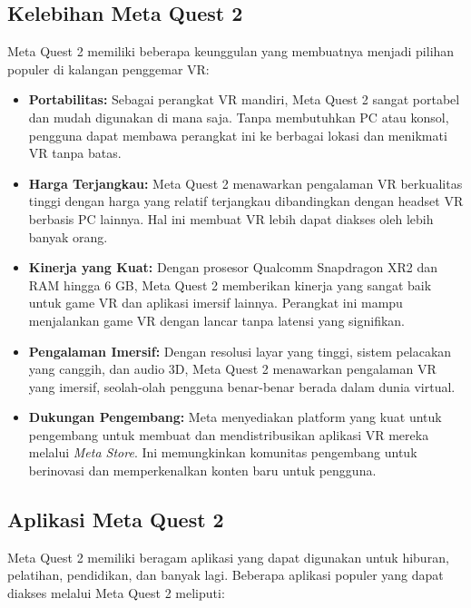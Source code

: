 \subsection{Kelebihan Meta Quest 2}
\label{subsec:kelebihandariquest2}

Meta Quest 2 memiliki beberapa keunggulan yang membuatnya menjadi pilihan populer di kalangan penggemar VR:

\begin{itemize}
    \item \textbf{Portabilitas:} Sebagai perangkat VR mandiri, Meta Quest 2 sangat portabel dan mudah digunakan di mana saja. Tanpa membutuhkan PC atau konsol, pengguna dapat membawa perangkat ini ke berbagai lokasi dan menikmati VR tanpa batas.
    \item \textbf{Harga Terjangkau:} Meta Quest 2 menawarkan pengalaman VR berkualitas tinggi dengan harga yang relatif terjangkau dibandingkan dengan headset VR berbasis PC lainnya. Hal ini membuat VR lebih dapat diakses oleh lebih banyak orang.
    \item \textbf{Kinerja yang Kuat:} Dengan prosesor Qualcomm Snapdragon XR2 dan RAM hingga 6 GB, Meta Quest 2 memberikan kinerja yang sangat baik untuk game VR dan aplikasi imersif lainnya. Perangkat ini mampu menjalankan game VR dengan lancar tanpa latensi yang signifikan.
    \item \textbf{Pengalaman Imersif:} Dengan resolusi layar yang tinggi, sistem pelacakan yang canggih, dan audio 3D, Meta Quest 2 menawarkan pengalaman VR yang imersif, seolah-olah pengguna benar-benar berada dalam dunia virtual.
    \item \textbf{Dukungan Pengembang:} Meta menyediakan platform yang kuat untuk pengembang untuk membuat dan mendistribusikan aplikasi VR mereka melalui \textit{Meta Store}. Ini memungkinkan komunitas pengembang untuk berinovasi dan memperkenalkan konten baru untuk pengguna.
\end{itemize}

\subsection{Aplikasi Meta Quest 2}
\label{subsec:aplikasimetaquest2}

Meta Quest 2 memiliki beragam aplikasi yang dapat digunakan untuk hiburan, pelatihan, pendidikan, dan banyak lagi. Beberapa aplikasi populer yang dapat diakses melalui Meta Quest 2 meliputi:

